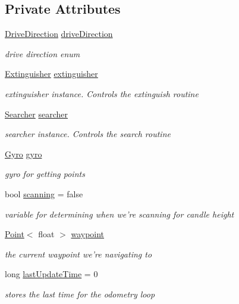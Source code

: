 \subsection*{Private Attributes}
\begin{DoxyCompactItemize}
\item 
\hyperlink{DriveMotor_8hpp_a077d9d13989efa3142086ea83cbb1e68}{Drive\-Direction} \hyperlink{classRobot_af15d2eaa46a9736e5d3d3aa9e8a9751c}{drive\-Direction}
\begin{DoxyCompactList}\small\item\em drive direction enum \end{DoxyCompactList}\item 
\hyperlink{classExtinguisher}{Extinguisher} \hyperlink{classRobot_a506ec05fcf24208b486c48367b003e96}{extinguisher}
\begin{DoxyCompactList}\small\item\em extinguisher instance. Controls the extinguish routine \end{DoxyCompactList}\item 
\hyperlink{classSearcher}{Searcher} \hyperlink{classRobot_af0ba30c47b84dc976f5bb7bd978f95ef}{searcher}
\begin{DoxyCompactList}\small\item\em searcher instance. Controls the search routine \end{DoxyCompactList}\item 
\hyperlink{classGyro}{Gyro} \hyperlink{classRobot_adafaf54e27eb3bd0cf08e32d7206e6a8}{gyro}
\begin{DoxyCompactList}\small\item\em gyro for getting points \end{DoxyCompactList}\item 
bool \hyperlink{classRobot_adcfb83201cfb8c8a7588d83aae0fc5be}{scanning} = false
\begin{DoxyCompactList}\small\item\em variable for determining when we're scanning for candle height \end{DoxyCompactList}\item 
\hyperlink{classPoint}{Point}$<$ float $>$ \hyperlink{classRobot_a4e7ca1c81831d252aa1545f549bff3f4}{waypoint}
\begin{DoxyCompactList}\small\item\em the current waypoint we're navigating to \end{DoxyCompactList}\item 
long \hyperlink{classRobot_a82a33c66efce935d2cac37c9f11c6efd}{last\-Update\-Time} = 0
\begin{DoxyCompactList}\small\item\em stores the last time for the odometry loop \end{DoxyCompactList}\end{DoxyCompactItemize}
